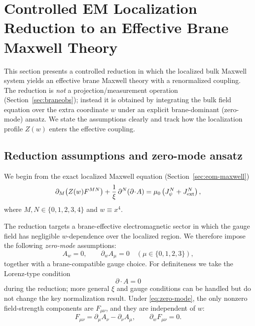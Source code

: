 \documentclass[11pt]{article}
\begin{document}
\section{Controlled EM Localization Reduction to an Effective Brane Maxwell Theory}
\label{sec:emreduction}

This section presents a controlled reduction in which the localized bulk Maxwell system yields an effective brane Maxwell theory with a renormalized coupling. The reduction is \emph{not} a projection/measurement operation (Section~\ref{sec:braneobs}); instead it is obtained by integrating the bulk field equation over the extra coordinate $w$ under an explicit brane-dominant (zero-mode) ansatz. We state the assumptions clearly and track how the localization profile $Z(w)$ enters the effective coupling.

\subsection{Reduction assumptions and zero-mode ansatz}
\label{sec:emreduction-ansatz}

We begin from the exact localized Maxwell equation (Section~\ref{sec:eom-maxwell})
\begin{equation}
\partial_M\!\left(Z(w)F^{MN}\right)
+\frac{1}{\xi}\,\partial^N(\partial\!\cdot\!A)
=
\mu_0\left(J_\psi^N+J_{\rm ext}^N\right),
\label{eq:maxwell-localized-again}
\end{equation}
where $M,N\in\{0,1,2,3,4\}$ and $w\equiv x^4$.

The reduction targets a brane-effective electromagnetic sector in which the gauge field has negligible $w$-dependence over the localized region. We therefore impose the following \emph{zero-mode} assumptions:
\begin{equation}
\boxed{
A_w = 0,
\qquad
\partial_w A_\mu = 0
\quad (\mu\in\{0,1,2,3\}),
}
\label{eq:zero-mode}
\end{equation}
together with a brane-compatible gauge choice. For definiteness we take the Lorenz-type condition
\begin{equation}
\partial\!\cdot\!A = 0
\label{eq:lorenz-gauge}
\end{equation}
during the reduction; more general $\xi$ and gauge conditions can be handled but do not change the key normalization result. Under \eqref{eq:zero-mode}, the only nonzero field-strength components are $F_{\mu\nu}$, and they are independent of $w$:
\begin{equation}
F_{\mu\nu} = \partial_\mu A_\nu - \partial_\nu A_\mu,
\qquad
\partial_w F_{\mu\nu}=0.
\end{equation}
\end{document}
